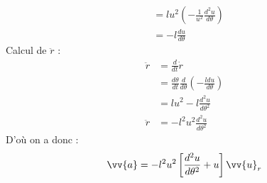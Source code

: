 \begin{explanation}
\begin{align*}
        &= lu^{2}\left( -\frac{1}{u^{2}} \frac{d^{2}u}{d \theta} \right)\\
        &= -l \frac{du}{d \theta}
    \end{align*}
    Calcul de \(\ddot{r}\) : 
    \begin{align*}
        \ddot{r} &= \frac{d}{dt}\dot{r} \\
        &= \frac{d \theta}{dt} \frac{d}{d \theta}\left( -\frac{ldu}{d \theta} \right) \\
        &= lu^{2} -l \frac{d^{2}u}{d \theta^{2}}\\
        \ddot{r} &= -l^{2}u^{2} \frac{d^{2}u}{d \theta^{2}}
    \end{align*}
    D'où on a donc :
    \[
        \vv{a} = -l^{2}u^{2} \left[ \frac{d^{2}u}{d \theta^{2}} +u  \right] \vv{u}_{r}
    \] 
\end{explanation}

